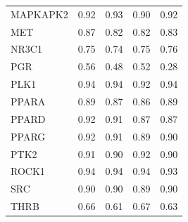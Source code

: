 \begin{longtable}{lrrrr}
MAPKAPK2 & 0.92 & 0.93 & 0.90 & 0.92 \\
MET & 0.87 & 0.82 & 0.82 & 0.83 \\
NR3C1 & 0.75 & 0.74 & 0.75 & 0.76 \\
PGR & 0.56 & 0.48 & 0.52 & 0.28 \\
PLK1 & 0.94 & 0.94 & 0.92 & 0.94 \\
PPARA & 0.89 & 0.87 & 0.86 & 0.89 \\
PPARD & 0.92 & 0.91 & 0.87 & 0.87 \\
PPARG & 0.92 & 0.91 & 0.89 & 0.90 \\
PTK2 & 0.91 & 0.90 & 0.92 & 0.90 \\
ROCK1 & 0.94 & 0.94 & 0.94 & 0.93 \\
SRC & 0.90 & 0.90 & 0.89 & 0.90 \\
THRB & 0.66 & 0.61 & 0.67 & 0.63 \\
\bottomrule
\end{longtable}
